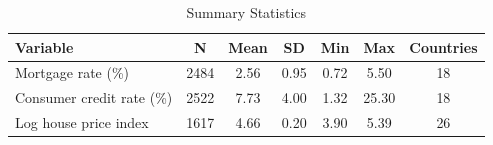 \begin{table}[!h]
\centering
\caption{\label{tab:sumstats}Summary Statistics}
\centering
\begin{tabular}[t]{lcccccc}
\toprule
Variable & N & Mean & SD & Min & Max & Countries\\
\midrule
Mortgage rate (\%) & 2484 & 2.56 & 0.95 & 0.72 & 5.50 & 18\\
Consumer credit rate (\%) & 2522 & 7.73 & 4.00 & 1.32 & 25.30 & 18\\
Log house price index & 1617 & 4.66 & 0.20 & 3.90 & 5.39 & 26\\
\bottomrule
\end{tabular}
\end{table}
